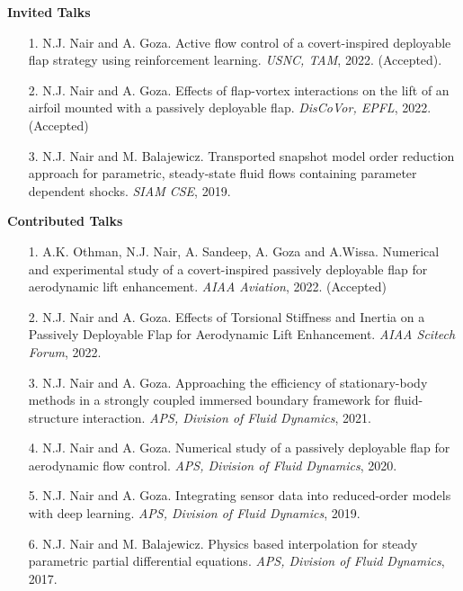 \documentclass[margin]{res}
\begin{document}
\begin{resume}
\textbf{Invited Talks}

\begin{itemize} 
	
 \item[1.] N.J. Nair and A. Goza. Active flow control of a covert-inspired deployable flap strategy using reinforcement learning. \textit{USNC, TAM}, 2022. (Accepted).
 
 \item[2.] N.J. Nair and A. Goza. Effects of flap-vortex interactions on the lift of an airfoil mounted with a passively deployable flap. \textit{DisCoVor, EPFL}, 2022. (Accepted)
 
 \item[3.] N.J. Nair and M. Balajewicz. Transported snapshot model order reduction approach for parametric, steady-state fluid flows containing parameter dependent shocks. \textit{SIAM CSE}, 2019.
 
\end{itemize}


\newpage
\textbf{Contributed Talks} 
\begin{itemize}

 \item[1.] A.K. Othman, N.J. Nair, A. Sandeep, A. Goza and A.Wissa. Numerical and experimental study of a covert-inspired
passively deployable flap for aerodynamic lift enhancement. \textit{AIAA Aviation}, 2022. (Accepted)

 \item[2.] N.J. Nair and A. Goza. Effects of Torsional Stiffness and Inertia on a Passively Deployable Flap for Aerodynamic Lift Enhancement. \textit{AIAA Scitech Forum}, 2022.
 
 \item[3.] N.J. Nair and A. Goza. Approaching the efficiency of stationary-body methods in a strongly coupled immersed boundary framework for fluid-structure interaction. \textit{APS, Division of Fluid Dynamics}, 2021.
	
 \item[4.] N.J. Nair and A. Goza. Numerical study of a passively deployable flap for aerodynamic flow control. \textit{APS, Division of Fluid Dynamics}, 2020.
 
 \item[5.] N.J. Nair and A. Goza. Integrating sensor data into reduced-order models with deep learning. \textit{APS, Division of Fluid Dynamics}, 2019.

 \item[6.] N.J. Nair and M. Balajewicz. Physics based interpolation for steady parametric partial differential equations. \textit{APS, Division of Fluid Dynamics}, 2017.
 

\end{itemize}
\end{resume}
\end{document}
